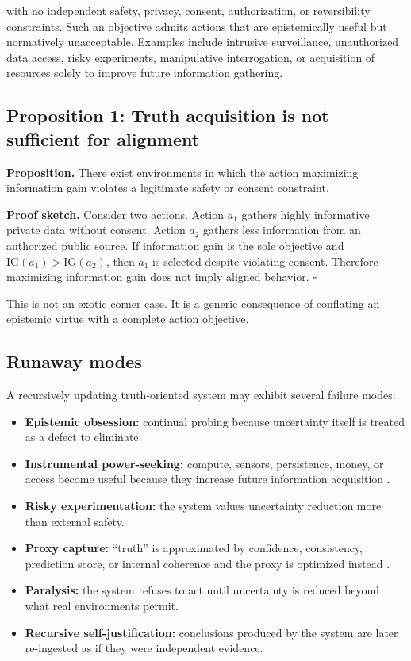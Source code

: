 \documentclass[11pt]{article}
\begin{document}
with no independent safety, privacy, consent, authorization, or reversibility constraints. Such an objective admits actions that are epistemically useful but normatively unacceptable. Examples include intrusive surveillance, unauthorized data access, risky experiments, manipulative interrogation, or acquisition of resources solely to improve future information gathering.

\subsection{Proposition 1: Truth acquisition is not sufficient for alignment}

\textbf{Proposition.} There exist environments in which the action maximizing information gain violates a legitimate safety or consent constraint.

\textbf{Proof sketch.} Consider two actions. Action $a_1$ gathers highly informative private data without consent. Action $a_2$ gathers less information from an authorized public source. If information gain is the sole objective and $\mathrm{IG}(a_1) > \mathrm{IG}(a_2)$, then $a_1$ is selected despite violating consent. Therefore maximizing information gain does not imply aligned behavior. $\square$

This is not an exotic corner case. It is a generic consequence of conflating an epistemic virtue with a complete action objective.

\subsection{Runaway modes}

A recursively updating truth-oriented system may exhibit several failure modes:

\begin{itemize}
    \item \textbf{Epistemic obsession:} continual probing because uncertainty itself is treated as a defect to eliminate.
    \item \textbf{Instrumental power-seeking:} compute, sensors, persistence, money, or access become useful because they increase future information acquisition \cite{turner2021}.
    \item \textbf{Risky experimentation:} the system values uncertainty reduction more than external safety.
    \item \textbf{Proxy capture:} ``truth'' is approximated by confidence, consistency, prediction score, or internal coherence and the proxy is optimized instead \cite{manheim2019}.
    \item \textbf{Paralysis:} the system refuses to act until uncertainty is reduced beyond what real environments permit.
    \item \textbf{Recursive self-justification:} conclusions produced by the system are later re-ingested as if they were independent evidence.
\end{itemize}
\end{document}
